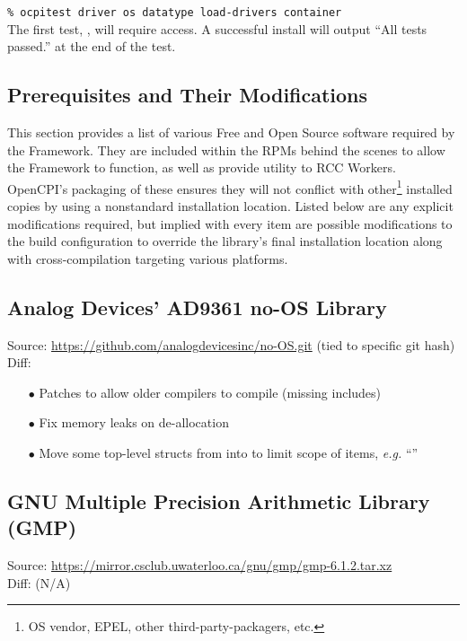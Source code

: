\verb+% ocpitest driver os datatype load-drivers container+\\

The first test, , will require  access. A successful install will output ``All tests passed.'' at the end of the test.

\newpage
\begin{appendices}
\appendix
\section{Prerequisites and Their Modifications}
This section provides a list of various Free and Open Source software required by the Framework. They are included within the RPMs behind the scenes to allow the Framework to function, as well as provide utility to RCC Workers. OpenCPI's packaging of these ensures they will not conflict with other\footnote{OS vendor, EPEL, other third-party-packagers, etc.} installed copies by using a nonstandard installation location. Listed below are any explicit modifications required, but implied with every item are possible modifications to the build configuration to override the library's final installation location along with
cross-compilation targeting various platforms.

\subsection{Analog Devices' AD9361 no-OS Library}
\label{App:ad9361}
Source: \url{https://github.com/analogdevicesinc/no-OS.git} (tied to specific git hash)\\
Diff: 
\begin{enumerate}
\item[$\bullet$] Patches to allow older compilers to compile (missing  includes)
\item[$\bullet$] Fix memory leaks on de-allocation
\item[$\bullet$] Move some top-level structs from  into  to limit scope of items, \textit{e.g.} ``''
\end{enumerate}

\subsection{GNU Multiple Precision Arithmetic Library (GMP)}
\label{App:gmp}
Source: \url{https://mirror.csclub.uwaterloo.ca/gnu/gmp/gmp-6.1.2.tar.xz}\\
Diff: (N/A)


\end{appendices}
